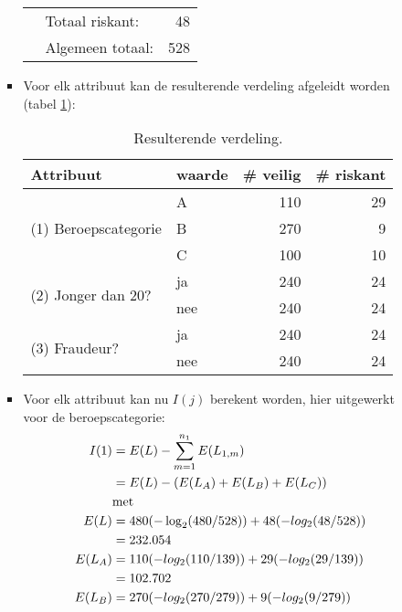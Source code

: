 \begin{itemize}
\begin{itemize}
\begin{itemize}
\begin{table}[ht]
\begin{tabular}{| c c c c | r |}
							\multicolumn{2}{|r}{}&\multicolumn{2}{l}{Totaal riskant:}	 & 48	 \\
							\multicolumn{2}{|r}{}&\multicolumn{2}{l}{Algemeen totaal:}	 & 528	\\
							\hline		
						\end{tabular}
					\end{table}
					\item Voor elk attribuut kan de resulterende verdeling afgeleidt worden (tabel \ref{table:resulterende_verdeling}):
					\begin{table}[ht]
						\centering
						\begin{tabular}{|l | l |rr|}
							\hline	
							Attribuut & waarde & \# veilig & \# riskant \\
							\hline	
							\multirow{3}{*}{(1) Beroepscategorie} & A & 110 & 29 \\
							& B & 270 & 9  \\
							& C & 100 & 10 \\
							\hline	
							\multirow{2}{*}{(2) Jonger dan 20?} & ja & 240 & 24 \\
							& nee & 240 & 24 \\
							\hline	
							\multirow{2}{*}{(3) Fraudeur?} & ja & 240 & 24 \\
							& nee & 240 & 24 \\
							\hline			
						\end{tabular}
						\caption{Resulterende verdeling.}
						\label{table:resulterende_verdeling}
					\end{table}
					\item Voor elk attribuut kan nu $I(j)$ berekent worden, hier uitgewerkt voor de beroepscategorie:	
					\begin{equation*}
						\begin{split}
							I(1) & = E(L) - \sum_{m = 1}^{n_1} E(L_{1, m})\\ 
							     & = E(L) - (E(L_A) + E(L_B) + E(L_C)) \\	
							     & \hbox{met} \\
							     E(L) & = 480(-\log_2(480/528)) + 48(-log_2(48/528)) \\
							          & = 232.054 \\
							     E(L_A) & = 110(-log_2(110/139)) + 29(-log_2(29/139)) \\
							            & = 102.702 \\
							     E(L_B) & = 270(-log_2(270/279)) + 9(-log_2(9/279))\\

\end{split}
\end{equation*}
\end{itemize}
\end{itemize}
\end{itemize}
